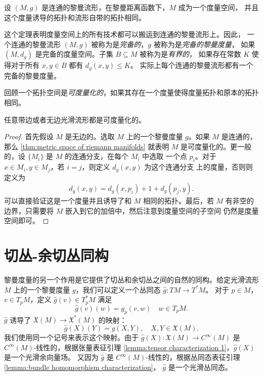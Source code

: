 \begin{theorem}[黎曼流形作为度量空间]\label{thm:metric space of riemann manifolds}
  设 $(M,g)$ 是连通的黎曼流形，在黎曼距离函数下，$M$ 成为一个度量空间，
  并且这个度量诱导的拓扑和流形自带的拓扑相同。
\end{theorem}

这个定理表明度量空间上的所有技术都可以搬运到连通的黎曼流形上。因此，
一个连通的黎曼流形 $(M,g)$ 被称为是\emph{完备的}，$g$ 被称为是\emph{完备的黎曼度量}，
如果 $(M,d_g)$ 是完备的度量空间。子集 $B\subseteq M$ 被称为是\emph{有界的}，
如果存在常数 $K$ 使得对于所有 $x,y\in B$ 都有 $d_g(x,y)\leq K$。
实际上每个连通的黎曼流形都有一个完备的黎曼度量。

回顾一个拓扑空间是\emph{可度量化的}，如果其存在一个度量使得度量拓扑和原本的拓扑
相同。

\begin{corollary}
  任意带边或者无边光滑流形都是可度量化的。
\end{corollary}
\begin{proof}
  首先假设 $M$ 是无边的。选取 $M$ 上的一个黎曼度量 $g$。如果 $M$
  是连通的，那么 \autoref{thm:metric space of riemann manifolds} 就表明 $M$
  是可度量化的。更一般的，设 $\{M_i\}$ 是 $M$ 的连通分支，在每个 $M_i$ 中选取
  一个点 $p_i$。对于 $x\in M_i,y\in M_j$，若 $i=j$，则定义 $d_g(x,y)$ 为这个连通分支
  上的度量，否则则定义为
  \[
    d_g(x,y)=d_g(x,p_i)+1+d_g(p_j,y).
  \]
  可以直接验证这是一个度量并且诱导了和 $M$ 相同的拓扑。最后，若 $M$
  有非空的边界，只需要将 $M$ 嵌入到它的加倍中，然后注意到度量空间的子空间
  仍然是度量空间即可。
\end{proof}



\section{切丛-余切丛同构}

黎曼度量的另一个作用是它提供了切丛和余切丛之间的自然的同构。给定光滑流形 $M$
上的一个黎曼度量 $g$，我们可以定义一个丛同态 $\hat g:TM\to T^*M$。
对于 $p\in M$，$v\in T_pM$，定义 $\hat g(v)\in T_p^*M$ 满足
\[
  \hat g(v)(w)=g_p(v,w)\quad w\in T_pM.  
\]
$\hat g$ 诱导了 $\mathfrak{X}(M)\to \mathfrak{X}^*(M)$ 的映射：
\[
  \hat g(X)(Y)=g(X,Y),\quad X,Y\in \mathfrak{X}(M).
\]
我们使用同一个记号来表示这个映射。由于 $\hat g(X):\mathfrak{X}(M)\to C^\infty(M)$
是 $C^\infty(M)$-线性的，根据张量表征引理 \ref{lemma:tensor characterization 1}，$\hat g(X)$ 是一个光滑余向量场。
又因为 $\hat g$ 是 $C^\infty(M)$-线性的，根据丛同态表征引理 \ref{lemma:bundle homomorphism characterization}，
$\hat g$ 是一个光滑丛同态。

